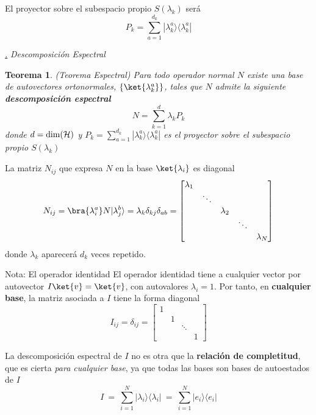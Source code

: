 \documentclass[a4paper,11pt]{book} %
\newtheorem{teorema_contador}{Teorema}
\newcommand{\Teorema}[1]{
		\begin{mybox_gray2}{}
			\begin{teorema_contador}
				 #1 
			\end{teorema_contador} 
		\end{mybox_gray2}
	}
\numberwithin{equation}{chapter}
\newcommand{\ketnew}[1]{|#1\rangle}
\newcommand{\ketbra}[2]{| #1\rangle \! \langle #2|}
\def\subsubiContadorIt{\par\addtocounter{subsubsection}{1}\underline{\it\thesubsubsection.}\hskip0.5cm \setcounter{subsubsubsectionIt}{0}}
\newcommand{\SubsubiIt}[1]{
		\subsubiContadorIt \textit{#1}
	}
\newcounter{subsubsubsectionIt}[subsubsection]
\begin{document}
El proyector sobre el subespacio propio $S(\lambda_k)$ será
\begin{equation}
P_k = \sum_{a=1}^{d_k} \ketbra{\lambda^a_k}{\lambda^a_k}
\end{equation}

			\SubsubiIt{Descomposición Espectral}

	\Teorema{ \textit{(Teorema Espectral)} 
	Para todo operador normal $N$ existe una base de  autovectores ortonormales,  $\{\ket{\lambda^a_k}\}$,  tales que  $N$ admite la siguiente  \textbf{descomposición espectral }
	\begin{equation}
	N = \sum_{k=1}^d \lambda_k   P_k
	\end{equation} 
donde $d=  {\rm dim}(\mathcal{H})$ y $P_k = \sum_{a=1}^{d_k} \ketbra{\lambda^a_k}{\lambda^a_k}$ es el proyector sobre el subespacio propio $S(\lambda_k)$
	}
La matriz $N_{ij}$ que expresa $N$ en la base $\ket{\lambda_i}$ es diagonal 
\begin{equation}
N_{ij} = \bra{\lambda^a_i} N\ketnew{\lambda^b_j} =  \lambda_k \delta_{kj} \delta_{ab} =\begin{bmatrix} \lambda_1 &  &  &  &  \\ & \ddots & & & \\ & & \lambda_2 & &  \\&  & & \ddots & \\  & & & &  \lambda_N \end{bmatrix}
\end{equation}
donde $\lambda_k$ aparecerá $d_k$ veces repetido.

	\begin{mybox_blue}{Nota: El operador identidad}
	El operador identidad tiene a cualquier vector por autovector $ I\ket{v} = \ket{v}$, con autovalores $\lambda_ i = 1$. Por tanto, en \textbf{cualquier base}, la matriz asociada a $I$ tiene la forma diagonal
	\begin{equation}
	I_{ij} = \delta_{ij} = \begin{bmatrix} 1 &  &  &  \\ & 1 & &  \\ & & \ddots & \\ & & &  1 \end{bmatrix}
	\end{equation}

	La descomposición espectral de $I$ no es otra que la \textbf{relación de completitud}, que es cierta \textit{para cualquier base}, ya que todas las bases son bases de autoestados de $I$
	\begin{equation}
	I ~=~ \sum_{i=1}^N \ketbra{\lambda_i}{\lambda_i} ~=~ \sum_{i=1}^N \ketbra{e_i}{e_i}
	\end{equation}	
	\end{mybox_blue}
\end{document}
